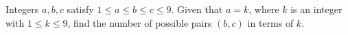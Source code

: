 Integers $a,b,c$ satisfy $1\le a\le b\le c\le9$. Given that $a=k$, where $k$ is an integer with $1\le k\le9$, find the number of possible pairs $(b,c)$ in terms of $k$.
